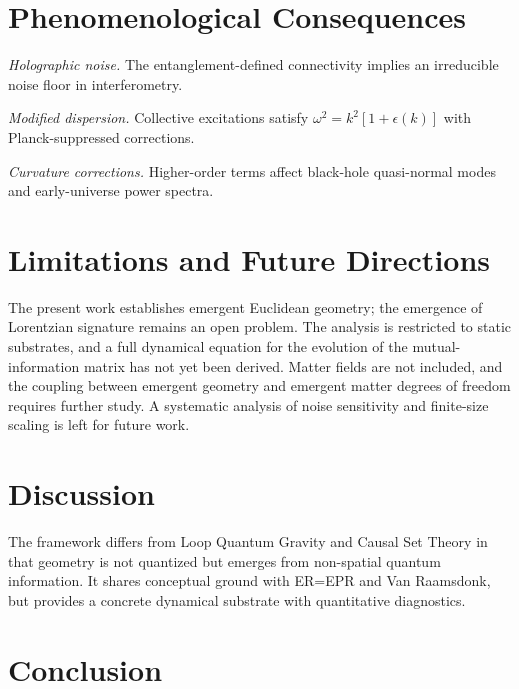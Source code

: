 \documentclass[aps,prd,twocolumn,nofootinbib,superscriptaddress]{revtex4-2}
\begin{document}
\section{Phenomenological Consequences}

\emph{Holographic noise.}  
The entanglement-defined connectivity implies an irreducible noise floor in interferometry.

\emph{Modified dispersion.}  
Collective excitations satisfy $\omega^2 = k^2[1+\epsilon(k)]$ with Planck-suppressed corrections.

\emph{Curvature corrections.}  
Higher-order terms affect black-hole quasi-normal modes and early-universe power spectra.

\section{Limitations and Future Directions}

The present work establishes emergent Euclidean geometry; the emergence of Lorentzian signature remains an open problem. The analysis is restricted to static substrates, and a full dynamical equation for the evolution of the mutual-information matrix has not yet been derived. Matter fields are not included, and the coupling between emergent geometry and emergent matter degrees of freedom requires further study. A systematic analysis of noise sensitivity and finite-size scaling is left for future work.

\section{Discussion}

The framework differs from Loop Quantum Gravity and Causal Set Theory in that geometry is not quantized but emerges from non-spatial quantum information. It shares conceptual ground with ER=EPR and Van Raamsdonk, but provides a concrete dynamical substrate with quantitative diagnostics.

\section{Conclusion}
\end{document}

